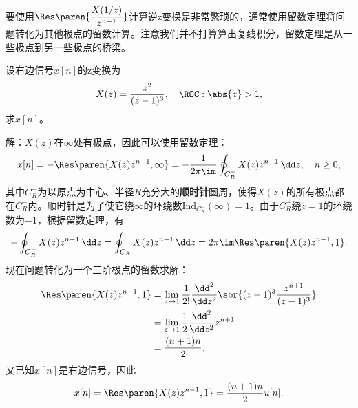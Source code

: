 要使用$\displaystyle\Res\paren{\frac{X(1/z)}{z^{n+1}}}$计算逆z变换是非常繁琐的，通常使用留数定理将问题转化为其他极点的留数计算。注意我们并不打算算出复线积分，留数定理是从一些极点到另一些极点的桥梁。
\begin{example}
    设右边信号$x[n]$的z变换为
    \begin{equation}
        X(z)=\frac{z^2}{(z-1)^3},\quad \ROC:\abs{z}>1,
    \end{equation}
    求$x[n]$。

    解：$X(z)$在$\infty$处有极点，因此可以使用留数定理：
    \begin{equation}
        x[n]=-\Res\paren{X(z)z^{n-1},\infty}=-\frac{1}{2\pi\im}\oint_{C^-_R}X(z)z^{n-1}\,\dd z,\quad n\geq 0,
    \end{equation}
    其中$C^-_R$为以原点为中心、半径$R$充分大的\textbf{顺时针}圆周，使得$X(z)$的所有极点都在$C^-_R$内。顺时针是为了使它绕$\infty$的环绕数$\mathrm{Ind}_{C^-_R}(\infty)=1$。由于$C^-_R$绕$z=1$的环绕数为$-1$，根据留数定理，有
    \begin{equation}
        -\oint_{C^-_R}X(z)z^{n-1}\,\dd z=\oint_{C_R}X(z)z^{n-1}\,\dd z=2\pi\im\Res\paren{X(z)z^{n-1},1}.
    \end{equation}
    现在问题转化为一个三阶极点的留数求解：
    \begin{align}
        \Res\paren{X(z)z^{n-1},1} & =\lim_{z\to 1}\frac{1}{2!}\frac{\dd^2}{\dd z^2}\sbr{(z-1)^3\frac{z^{n+1}}{(z-1)^3}}\nonumber \\
                                  & =\lim_{z\to 1}\frac{1}{2}\frac{\dd^2}{\dd z^2}z^{n+1}\nonumber                               \\
                                  & =\frac{(n+1)n}{2},
    \end{align}
    又已知$x[n]$是右边信号，因此
    \begin{equation}
        x[n]=\Res\paren{X(z)z^{n-1},1}=\frac{(n+1)n}{2}u[n].
    \end{equation}
\end{example}

